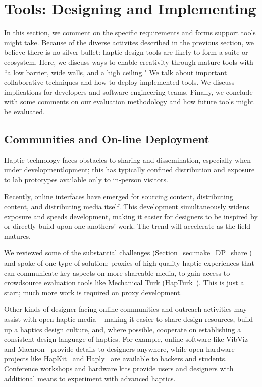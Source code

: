 \section{\haxd Tools: Designing and Implementing}
In this section, we comment on the specific requirements and forms \haxd support tools might take.
Because of the diverse activites described in the previous section, we believe there is no silver bullet: haptic design tools are likely to form a suite or ecosystem.
Here, we discuss ways to enable creativity through mature tools with ``a low barrier, wide walls, and a high ceiling."
We talk about important collaborative techniques and how to deploy implemented tools.
We discuss implications for developers and software engineering teams.
Finally, we conclude with some comments on our evaluation methodology and how future \haxd tools might be evaluated.


\subsection{Communities and On-line Deployment}
Haptic technology faces obstacles to sharing and dissemination, especially when under developmentlopment; this has typically confined distribution and exposure to lab prototypes available only to in-person visitors.

Recently, online interfaces have emerged for sourcing content, distributing content, and distributing media itself. 
This development  simultaneously widens exposure and speeds development, making it easier for designers to be inspired by or directly build upon one anothers' work. 
The trend will accelerate as the field matures.


    We reviewed some of the substantial challenges  (Section~\ref{sec:make_DP_share}) and spoke of one type of solution: proxies of high quality haptic experiences that can communicate key aspects on more shareable media, to gain access to crowdsource evaluation tools like Mechanical Turk (HapTurk~\cite{Schneider2016b}). This is just a start; much more work is required on proxy development.

    Other kinds of designer-facing online communities and outreach activities may assist with open haptic media -- making it easier to share design resources,  build up a haptics design culture, and, where possible, cooperate on establishing a consistent design language of haptics. 
%
    For example, online software like VibViz~\cite{seifi2015vibviz} and Macaron~\cite{schneider2015tactile} provide details to designers anywhere, while open hardware projects like HapKit~\cite{Martinez2016} and Haply~\cite{Gallacher2016} are available to hackers and students.
    Conference workshops and hardware kits provide users and designers with additional means to experiment with advanced haptics.
    
